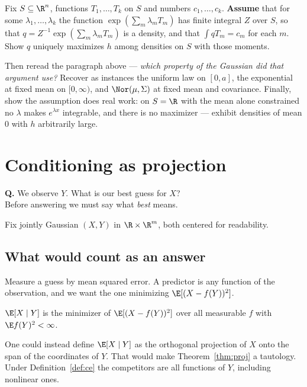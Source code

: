 \documentclass[11pt]{article}
\begin{document}
\begin{exercise}[\ty{C}]
Fix $S\subseteq\R^n$, functions $T_1,\dots,T_k$ on $S$ and numbers $c_1,\dots,c_k$. \textbf{Assume} that for some $\lambda_1,\dots,\lambda_k$ the function $\exp(\sum_m\lambda_mT_m)$ has finite integral $Z$ over $S$, so that $q=Z^{-1}\exp(\sum_m\lambda_mT_m)$ is a density, and that $\int qT_m=c_m$ for each $m$. Show $q$ uniquely maximizes $h$ among densities on $S$ with those moments.

Then reread the paragraph above --- \emph{which property of the Gaussian did that argument use?} Recover as instances the uniform law on $[0,a]$, the exponential at fixed mean on $[0,\infty)$, and $\Nor(\mu,\Sigma)$ at fixed mean and covariance. Finally, show the assumption does real work: on $S=\R$ with the mean alone constrained no $\lambda$ makes $e^{\lambda x}$ integrable, and there is no maximizer --- exhibit densities of mean $0$ with $h$ arbitrarily large.
\end{exercise}

\section{Conditioning as projection}

\begin{question}
\textbf{Q.} We observe $Y$. What is our best guess for $X$?\\[0.35em]
Before answering we must say what \emph{best} means.
\end{question}

Fix jointly Gaussian $(X,Y)$ in $\R\times\R^m$, both centered for readability.

\subsection{What would count as an answer}

Measure a guess by mean squared error. A predictor is any function of the observation, and we want the one minimizing $\E[(X-f(Y))^2]$.

\begin{definition}\label{def:ce}
$\E[X\mid Y]$ is the minimizer of $\E[(X-f(Y))^2]$ over all measurable $f$ with $\E f(Y)^2<\infty$.
\end{definition}

One could instead define $\E[X\mid Y]$ as the orthogonal projection of $X$ onto the span of the coordinates of $Y$. That would make Theorem~\ref{thm:proj} a tautology. Under Definition~\ref{def:ce} the competitors are all functions of $Y$, including nonlinear ones.
\end{document}
